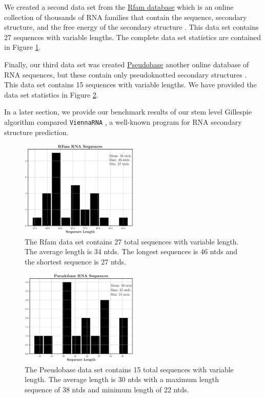 \documentclass[11pt]{article}
\begin{document}
\begin{multicols}{2}
\begin{center}
\end{center}

We created a second data set from the \href{https://rfam.xfam.org}{Rfam database}   which is an online collection of thousands of RNA families that contain the sequence, secondary structure, and the free energy of the secondary structure \cite{ 10.1093/nar/gkv480, doi:10.1002/cpbi.51}. This data set contains 27 sequences with variable lengths. The complete data set statistics are contained in Figure \ref{fig:rfam}.

Finally, our third data set was created \href{http://pseudobaseplusplus.utep.edu/home}{Pseudobase} another online database of RNA sequences, but these contain only pseudoknotted secondary structures \cite{10.1093/nar/28.1.201}. This data set contains 15 sequences with variable lengths. We have provided the data set statistics in Figure \ref{fig:pseudobase}.

In a later section, we provide our benchmark results of our stem level Gillespie algorithm compared \texttt{ViennaRNA} \cite{Lorenz2011}, a well-known program for RNA secondary structure prediction.
\end{multicols}

\begin{multicols}{2}
\begin{figure}[H]
\centering
\includegraphics[width = 0.5\textwidth]{fig/rfam}
\caption{The Rfam data set contains 27 total sequences with variable length. The average length is 34 ntds. The longest sequences is 46 ntds and the shortest sequence is 27 ntds.}
\label{fig:rfam}
\end{figure}

\begin{figure}[H]
    \centering
    \includegraphics[width = 0.5\textwidth]{fig/pseudobase.eps}
    \caption{The Pseudobase data set contains 15 total sequences with variable length. The average length is 30 ntds with a maximum length sequence of 38 ntds and minimum length of 22 ntds.}
    \label{fig:pseudobase}
\end{figure}
\end{multicols}
\end{document}
